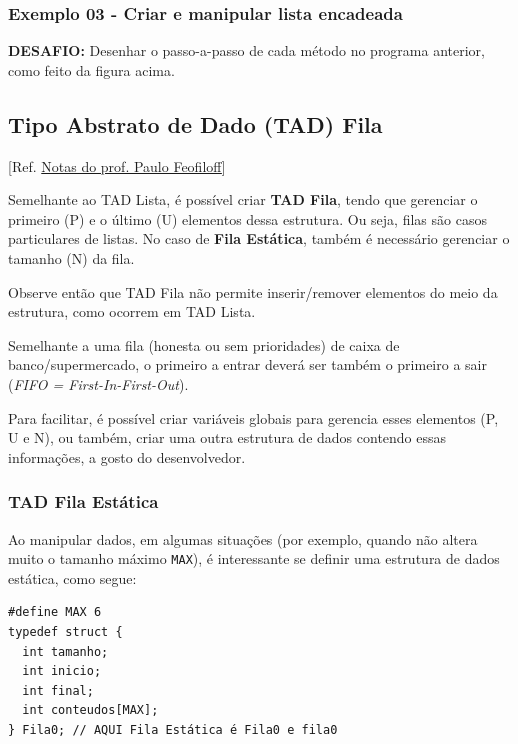 \documentclass[12pt,a4paper]{article}
\begin{document}
    \hypertarget{exemplo-03---criar-e-manipular-lista-encadeada}{%
\subsubsection{Exemplo 03 - Criar e manipular lista
encadeada}\label{exemplo-03---criar-e-manipular-lista-encadeada}}

    \textbf{DESAFIO:} Desenhar o passo-a-passo de cada método no programa
anterior, como feito da figura acima.

    \hypertarget{tipo-abstrato-de-dado-tad-fila}{%
\subsection{Tipo Abstrato de Dado (TAD)
Fila}\label{tipo-abstrato-de-dado-tad-fila}}

    {[}Ref.
\href{https://www.ime.usp.br/~pf/algoritmos/aulas/fila.html}{Notas do
prof. Paulo Feofiloff}{]}

Semelhante ao TAD Lista, é possível criar \textbf{TAD Fila}, tendo que
gerenciar o primeiro (P) e o último (U) elementos dessa estrutura. Ou
seja, filas são casos particulares de listas. No caso de \textbf{Fila
Estática}, também é necessário gerenciar o tamanho (N) da fila.

Observe então que TAD Fila não permite inserir/remover elementos do meio
da estrutura, como ocorrem em TAD Lista.

Semelhante a uma fila (honesta ou sem prioridades) de caixa de
banco/supermercado, o primeiro a entrar deverá ser também o primeiro a
sair (\emph{FIFO = First-In-First-Out}).

Para facilitar, é possível criar variáveis globais para gerencia esses
elementos (P, U e N), ou também, criar uma outra estrutura de dados
contendo essas informações, a gosto do desenvolvedor.

    \hypertarget{tad-fila-estuxe1tica}{%
\subsubsection{TAD Fila Estática}\label{tad-fila-estuxe1tica}}

    Ao manipular dados, em algumas situações (por exemplo, quando não altera
muito o tamanho máximo \texttt{MAX}), é interessante se definir uma
estrutura de dados estática, como segue:

\begin{verbatim}
#define MAX 6
typedef struct {
  int tamanho;
  int inicio;
  int final;
  int conteudos[MAX];
} Fila0; // AQUI Fila Estática é Fila0 e fila0
\end{verbatim}
\end{document}
